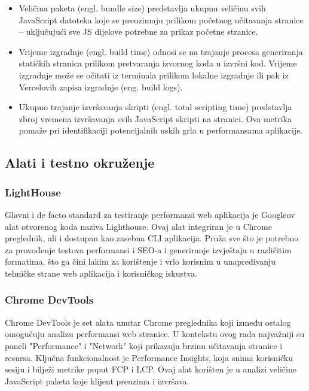 \begin{itemize}
    \item Veličina paketa (engl. bundle size) predstavlja ukupnu veličinu svih JavaScript datoteka koje se preuzimaju prilikom početnog učitavanja stranice – uključujući sve JS dijelove potrebne za prikaz početne stranice.
    \item Vrijeme izgradnje (engl. build time) odnosi se na trajanje procesa generiranja statičkih stranica prilikom pretvaranja izvornog koda u izvršni kod. Vrijeme izgradnje može se očitati iz terminala prilikom lokalne izgradnje ili pak iz Vercelovih zapisa izgradnje (eng. build logs).
    \item Ukupno trajanje izvršavanja skripti (engl. total scripting time) predstavlja zbroj vremena izvršavanja svih JavaScript skripti na stranici. Ova metrika pomaže pri identifikaciji potencijalnih uskih grla u performansama aplikacije.
\end{itemize}

\subsection{Alati i testno okruženje}

\subsubsection{LightHouse}

Glavni i de facto standard za testiranje performansi web aplikacija je Googleov alat otvorenog koda naziva Lighthouse. Ovaj alat integriran je u Chrome preglednik, ali i dostupan kao zasebna CLI aplikacija. Pruža sve što je potrebno za provođenje testova performansi i SEO-a i generiranje izvještaja u različitim formatima, što ga čini lakim za korištenje i vrlo korisnim u unapređivanju tehničke strane web aplikacija i korisničkog iskustva. \cite{googlelighthouse}

\subsubsection{Chrome DevTools}

Chrome DevTools je set alata unutar Chrome preglednika koji između ostalog omogućuju analizu performansi web stranice. U kontekstu ovog rada najvažniji su paneli "Performance" i "Network" koji prikazuju brzinu učitavanja stranice i resursa. Ključna funkcionalnost je Performance Insights, koja snima korisničku sesiju i bilježi metrike poput FCP i LCP. Ovaj alat korišten je u analizi veličine JavaScript paketa koje klijent preuzima i izvršava. \cite{nordstrom2023comparison}

